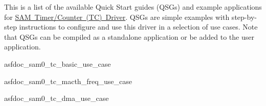 This is a list of the available Quick Start guides (QSGs) and example applications for \mbox{\hyperlink{group__asfdoc__sam0__tc__group}{SAM Timer/\+Counter (TC) Driver}}. QSGs are simple examples with step-\/by-\/step instructions to configure and use this driver in a selection of use cases. Note that QSGs can be compiled as a standalone application or be added to the user application.


\begin{DoxyItemize}
\item asfdoc\+\_\+sam0\+\_\+tc\+\_\+basic\+\_\+use\+\_\+case
\item asfdoc\+\_\+sam0\+\_\+tc\+\_\+macth\+\_\+freq\+\_\+use\+\_\+case 
\item asfdoc\+\_\+sam0\+\_\+tc\+\_\+dma\+\_\+use\+\_\+case 
\end{DoxyItemize}